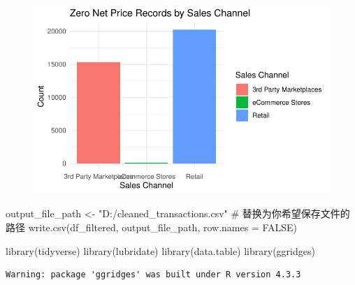 \documentclass[
  letterpaper,
  DIV=11,
  numbers=noendperiod]{scrartcl}
\newenvironment{Shaded}{\begin{snugshade}}{\end{snugshade}}
\newcommand{\AttributeTok}[1]{\textcolor[rgb]{0.40,0.45,0.13}{#1}}
\newcommand{\CommentTok}[1]{\textcolor[rgb]{0.37,0.37,0.37}{#1}}
\newcommand{\ConstantTok}[1]{\textcolor[rgb]{0.56,0.35,0.01}{#1}}
\newcommand{\FunctionTok}[1]{\textcolor[rgb]{0.28,0.35,0.67}{#1}}
\newcommand{\NormalTok}[1]{\textcolor[rgb]{0.00,0.23,0.31}{#1}}
\newcommand{\OtherTok}[1]{\textcolor[rgb]{0.00,0.23,0.31}{#1}}
\newcommand{\StringTok}[1]{\textcolor[rgb]{0.13,0.47,0.30}{#1}}
\begin{document}
\begin{figure}[H]

{\centering \includegraphics{Time-Serise-EDA_files/figure-pdf/unnamed-chunk-6-1.pdf}

}

\end{figure}

\begin{Shaded}
\begin{Highlighting}[]
\NormalTok{output\_file\_path }\OtherTok{\textless{}{-}} \StringTok{"D:/cleaned\_transactions.csv"}  \CommentTok{\# 替换为你希望保存文件的路径}
\FunctionTok{write.csv}\NormalTok{(df\_filtered, output\_file\_path, }\AttributeTok{row.names =} \ConstantTok{FALSE}\NormalTok{)}
\end{Highlighting}
\end{Shaded}

\begin{Shaded}
\begin{Highlighting}[]
\FunctionTok{library}\NormalTok{(tidyverse)}
\FunctionTok{library}\NormalTok{(lubridate)}
\FunctionTok{library}\NormalTok{(data.table)}
\FunctionTok{library}\NormalTok{(ggridges)}
\end{Highlighting}
\end{Shaded}

\begin{verbatim}
Warning: package 'ggridges' was built under R version 4.3.3
\end{verbatim}
\end{document}
